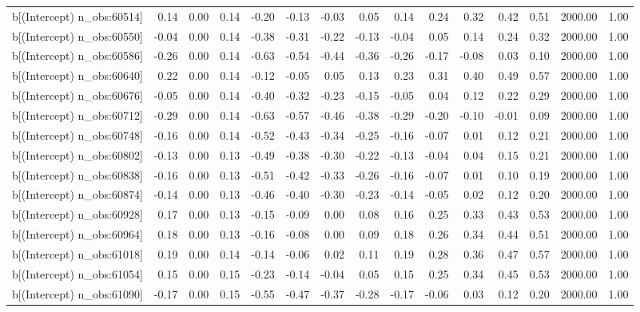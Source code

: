 \begin{table}[ht]
\begin{tabular}{rrrrrrrrrrrrrrr}
  b[(Intercept) n\_obs:60514] & 0.14 & 0.00 & 0.14 & -0.20 & -0.13 & -0.03 & 0.05 & 0.14 & 0.24 & 0.32 & 0.42 & 0.51 & 2000.00 & 1.00 \\ 
  b[(Intercept) n\_obs:60550] & -0.04 & 0.00 & 0.14 & -0.38 & -0.31 & -0.22 & -0.13 & -0.04 & 0.05 & 0.14 & 0.24 & 0.32 & 2000.00 & 1.00 \\ 
  b[(Intercept) n\_obs:60586] & -0.26 & 0.00 & 0.14 & -0.63 & -0.54 & -0.44 & -0.36 & -0.26 & -0.17 & -0.08 & 0.03 & 0.10 & 2000.00 & 1.00 \\ 
  b[(Intercept) n\_obs:60640] & 0.22 & 0.00 & 0.14 & -0.12 & -0.05 & 0.05 & 0.13 & 0.23 & 0.31 & 0.40 & 0.49 & 0.57 & 2000.00 & 1.00 \\ 
  b[(Intercept) n\_obs:60676] & -0.05 & 0.00 & 0.14 & -0.40 & -0.32 & -0.23 & -0.15 & -0.05 & 0.04 & 0.12 & 0.22 & 0.29 & 2000.00 & 1.00 \\ 
  b[(Intercept) n\_obs:60712] & -0.29 & 0.00 & 0.14 & -0.63 & -0.57 & -0.46 & -0.38 & -0.29 & -0.20 & -0.10 & -0.01 & 0.09 & 2000.00 & 1.00 \\ 
  b[(Intercept) n\_obs:60748] & -0.16 & 0.00 & 0.14 & -0.52 & -0.43 & -0.34 & -0.25 & -0.16 & -0.07 & 0.01 & 0.12 & 0.21 & 2000.00 & 1.00 \\ 
  b[(Intercept) n\_obs:60802] & -0.13 & 0.00 & 0.13 & -0.49 & -0.38 & -0.30 & -0.22 & -0.13 & -0.04 & 0.04 & 0.15 & 0.21 & 2000.00 & 1.00 \\ 
  b[(Intercept) n\_obs:60838] & -0.16 & 0.00 & 0.13 & -0.51 & -0.42 & -0.33 & -0.26 & -0.16 & -0.07 & 0.01 & 0.10 & 0.19 & 2000.00 & 1.00 \\ 
  b[(Intercept) n\_obs:60874] & -0.14 & 0.00 & 0.13 & -0.46 & -0.40 & -0.30 & -0.23 & -0.14 & -0.05 & 0.02 & 0.12 & 0.20 & 2000.00 & 1.00 \\ 
  b[(Intercept) n\_obs:60928] & 0.17 & 0.00 & 0.13 & -0.15 & -0.09 & 0.00 & 0.08 & 0.16 & 0.25 & 0.33 & 0.43 & 0.53 & 2000.00 & 1.00 \\ 
  b[(Intercept) n\_obs:60964] & 0.18 & 0.00 & 0.13 & -0.16 & -0.08 & 0.00 & 0.09 & 0.18 & 0.26 & 0.34 & 0.44 & 0.51 & 2000.00 & 1.00 \\ 
  b[(Intercept) n\_obs:61018] & 0.19 & 0.00 & 0.14 & -0.14 & -0.06 & 0.02 & 0.11 & 0.19 & 0.28 & 0.36 & 0.47 & 0.57 & 2000.00 & 1.00 \\ 
  b[(Intercept) n\_obs:61054] & 0.15 & 0.00 & 0.15 & -0.23 & -0.14 & -0.04 & 0.05 & 0.15 & 0.25 & 0.34 & 0.45 & 0.53 & 2000.00 & 1.00 \\ 
  b[(Intercept) n\_obs:61090] & -0.17 & 0.00 & 0.15 & -0.55 & -0.47 & -0.37 & -0.28 & -0.17 & -0.06 & 0.03 & 0.12 & 0.20 & 2000.00 & 1.00 \\ 

\end{tabular}
\end{table}
